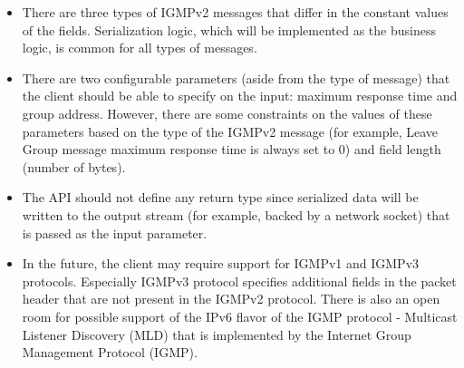 \begin{itemize}
    \item
    There are three types of IGMPv2 messages that differ in the constant values of the fields.
    Serialization logic, which will be implemented as the business logic, is common for all types of messages.
    \item
    There are two configurable parameters (aside from the type of message) that the client should be able to specify
    on the input: maximum response time and group address.
    However, there are some constraints on the values of these parameters based on the type of the IGMPv2 message
    (for example, Leave Group message maximum response time is always set to 0) and field length (number of bytes).
    \item
    The API should not define any return type since serialized data will be written to the output stream
    (for example, backed by a network socket) that is passed as the input parameter.
    \item
    In the future, the client may require support for IGMPv1 and IGMPv3 protocols.
    Especially IGMPv3 protocol specifies additional fields in the packet header that are not present
    in the IGMPv2 protocol.
    There is also an open room for possible support of the IPv6 flavor of the IGMP protocol
    - Multicast Listener Discovery (MLD) that is implemented by the Internet Group Management Protocol (IGMP).
\end{itemize}
